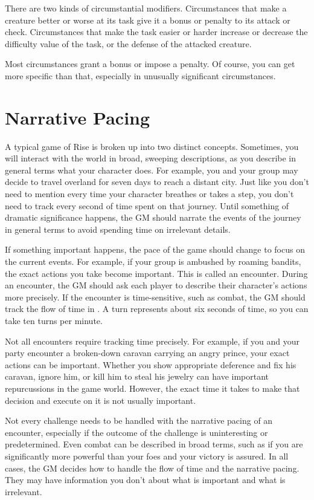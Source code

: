   There are two kinds of circumstantial modifiers.
  Circumstances that make a creature better or worse at its task give it a bonus or penalty to its attack or check.
  Circumstances that make the task easier or harder increase or decrease the difficulty value of the task, or the defense of the attacked creature.

  Most circumstances grant a  bonus or impose a  penalty.
  Of course, you can get more specific than that, especially in unusually significant circumstances.

\section{Narrative Pacing}
  A typical game of Rise is broken up into two distinct concepts.
  Sometimes, you will interact with the world in broad, sweeping descriptions, as you describe in general terms what your character does.
  For example, you and your group may decide to travel overland for seven days to reach a distant city.
  Just like you don't need to mention every time your character breathes or takes a step, you don't need to track every second of time spent on that journey.
  Until something of dramatic significance happens, the GM should narrate the events of the journey in general terms to avoid spending time on irrelevant details.

  If something important happens, the pace of the game should change to focus on the current events.
  For example, if your group is ambushed by roaming bandits, the exact actions you take become important.
  This is called an encounter.
  During an encounter, the GM should ask each player to describe their character's actions more precisely.
  If the encounter is time-sensitive, such as combat, the GM should track the flow of time in .
  A turn represents about six seconds of time, so you can take ten turns per minute.

  Not all encounters require tracking time precisely.
  For example, if you and your party encounter a broken-down caravan carrying an angry prince, your exact actions can be important.
  Whether you show appropriate deference and fix his caravan, ignore him, or kill him to steal his jewelry can have important repurcussions in the game world.
  However, the exact time it takes to make that decision and execute on it is not usually important.

  Not every challenge needs to be handled with the narrative pacing of an encounter, especially if the outcome of the challenge is uninteresting or predetermined.
  Even combat can be described in broad terms, such as if you are significantly more powerful than your foes and your victory is assured.
  In all cases, the GM decides how to handle the flow of time and the narrative pacing.
  They may have information you don't about what is important and what is irrelevant.

